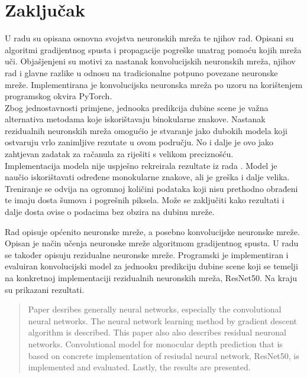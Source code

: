 \documentclass[times, utf8, zavrsni, numeric]{fer}
\begin{document}
\chapter{Zaključak}
U radu su opisana osnovna svojstva neuronskih mreža te njihov rad. Opisani su
algoritmi gradijentnog spusta i propagacije pogreške unatrag pomoću kojih 
mreža uči. Objašjenjeni su motivi za nastanak konvolucijskih neuronskih mreža,
njihov rad i glavne razlike u odnosu na tradicionalne potpuno povezane 
neuronske mreže. Implementirana je konvolucijska neuronska mreža po 
uzoru na \cite{DBLP:journals/corr/LainaRBTN16} korištenjem programskog
okvira PyTorch.
\\\indent Zbog jednostavnosti primjene, jednooka predikcija dubine scene je
važna alternativa metodama koje iskorištavaju binokularne znakove. Nastanak
rezidualnih neuronskih mreža omogućio je stvaranje jako dubokih modela koji
ostvaruju vrlo zanimljive rezutate u ovom području. No i dalje je ovo jako 
zahtjevan zadatak za račanula za riješiti s velikom preciznošću.
\\\indent Implementacija modela nije uspješno rekreirala rezultate iz rada
\cite{DBLP:journals/corr/LainaRBTN16}. Model je naučio iskorištavati određene
monokularne znakove, ali je greška i dalje velika. Treniranje se odvija na ogromnoj
količini podataka koji nisu prethodno obrađeni te imaju dosta šumova i pogrešnih
piksela. Može se zaključiti kako rezultati i dalje dosta ovise o podacima 
bez obzira na dubinu mreže. 



\nocite{Cupic-UNN}
\nocite{Goodfellow-et-al-2016}
\nocite{DBLP:journals/corr/HeZRS15}
\nocite{Andelic}
\nocite{Nielsen}

\begin{sazetak}
Rad opisuje općenito neuronske mreže, a posebno konvolucijske
neuronske mreže. Opisan je način učenja neuronske mreže algoritmom gradijentnog
spusta. U radu se također opisuju rezidualne neuronske mreže. Programski je
implementiran i evaluiran konvolucijski model za jednooku predikciju dubine 
scene koji se temelji na konkretnoj implementaciji rezidualnih neuronskih
mreža, ResNet50. Na kraju su prikazani rezultati.

\end{sazetak}

\begin{abstract}
Paper desribes generally neural networks, especially the
convolutional neural networks. The neural network learning method by gradient 
descent algorithm is described. This paper also also describes residual neuronal 
networks. Convolutional model for monocular depth prediction that is based
on concrete implementation of resiudal neural network, ResNet50, is implemented
and evaluated. Lastly, the results are presented.

\end{abstract}
\end{document}

